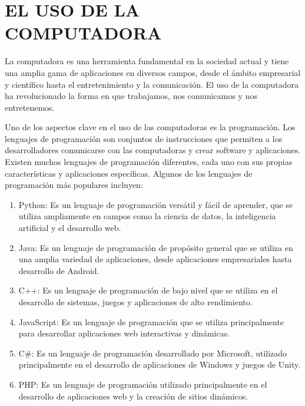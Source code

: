 \chapterspaceabove{6.75cm} %
\chapterspacebelow{7.25cm} %


\chapter{EL USO DE LA COMPUTADORA}


La computadora es una herramienta fundamental en la sociedad actual y tiene una amplia gama de aplicaciones en diversos campos, desde el ámbito empresarial y científico hasta el entretenimiento y la comunicación. El uso de la computadora ha revolucionado la forma en que trabajamos, nos comunicamos y nos entretenemos.



Uno de los aspectos clave en el uso de las computadoras es la programación. Los lenguajes de programación son conjuntos de instrucciones que permiten a los desarrolladores comunicarse con las computadoras y crear software y aplicaciones. Existen muchos lenguajes de programación diferentes, cada uno con sus propias características y aplicaciones específicas. Algunos de los lenguajes de programación más populares incluyen:
\begin{enumerate}
\item Python: Es un lenguaje de programación versátil y fácil de aprender, que se utiliza ampliamente en campos como la ciencia de datos, la inteligencia artificial y el desarrollo web.
\item Java: Es un lenguaje de programación de propósito general que se utiliza en una amplia variedad de aplicaciones, desde aplicaciones empresariales hasta desarrollo de Android.
\item C++: Es un lenguaje de programación de bajo nivel que se utiliza en el desarrollo de sistemas, juegos y aplicaciones de alto rendimiento.
\item JavaScript: Es un lenguaje de programación que se utiliza principalmente para desarrollar aplicaciones web interactivas y dinámicas.
\item C\#: Es un lenguaje de programación desarrollado por Microsoft, utilizado principalmente en el desarrollo de aplicaciones de Windows y juegos de Unity.
\item PHP: Es un lenguaje de programación utilizado principalmente en el desarrollo de aplicaciones web y la creación de sitios dinámicos.
\end{enumerate}


